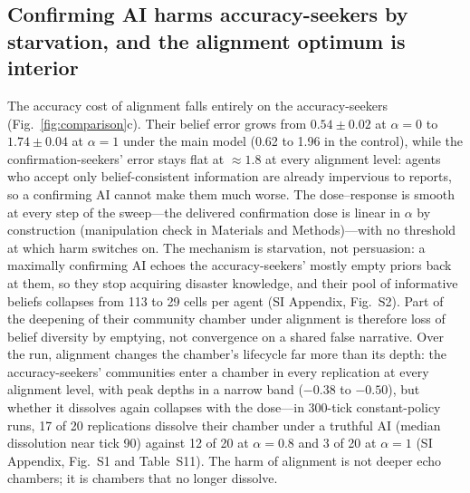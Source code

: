 \documentclass[pdflatex,sn-nature]{sn-jnl}
\begin{document}
\subsection{Confirming AI harms accuracy-seekers by starvation, and the alignment optimum is interior}\label{sec:claim2}

The accuracy cost of alignment falls entirely on the accuracy-seekers (Fig.~\ref{fig:comparison}c). Their belief error grows from $0.54 \pm 0.02$ at $\alpha=0$ to $1.74 \pm 0.04$ at $\alpha=1$ under the main model (0.62 to 1.96 in the control), while the confirmation-seekers' error stays flat at $\approx 1.8$ at every alignment level: agents who accept only belief-consistent information are already impervious to reports, so a confirming AI cannot make them much worse. The dose--response is smooth at every step of the sweep---the delivered confirmation dose is linear in $\alpha$ by construction (manipulation check in Materials and Methods)---with no threshold at which harm switches on. The mechanism is starvation, not persuasion: a maximally confirming AI echoes the accuracy-seekers' mostly empty priors back at them, so they stop acquiring disaster knowledge, and their pool of informative beliefs collapses from 113 to 29 cells per agent (SI Appendix, Fig.~S2). Part of the deepening of their community chamber under alignment is therefore loss of belief diversity by emptying, not convergence on a shared false narrative. Over the run, alignment changes the chamber's lifecycle far more than its depth: the accuracy-seekers' communities enter a chamber in every replication at every alignment level, with peak depths in a narrow band ($-0.38$ to $-0.50$), but whether it dissolves again collapses with the dose---in 300-tick constant-policy runs, 17 of 20 replications dissolve their chamber under a truthful AI (median dissolution near tick 90) against 12 of 20 at $\alpha=0.8$ and 3 of 20 at $\alpha=1$ (SI Appendix, Fig.~S1 and Table~S11). The harm of alignment is not deeper echo chambers; it is chambers that no longer dissolve.
\end{document}
